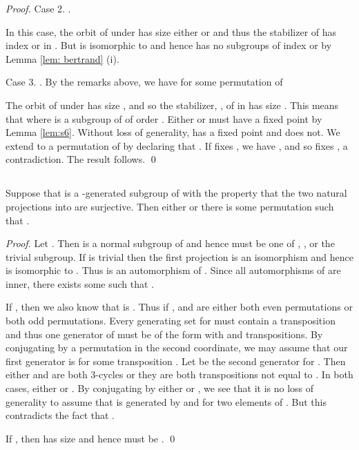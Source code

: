 \documentclass{llncs}
\begin{document}
\begin{proof}
\item[Case 2. .]

In this case, the orbit of  under  has size either  or  and thus the stabilizer of  has index  or  in .  But  is isomorphic to  and hence has no subgroups of index  or  by Lemma \ref{lem: bertrand} (i).

\item[Case 3. .]
By the remarks above, we have 
 for some permutation  of 

The orbit of  under  has size , and so the stabilizer, , of  in  has size .  This means  that  where  is a subgroup of  of order .  Either  or  must have a fixed point by Lemma \ref{lem:s6}.  Without loss of generality,  has a fixed point and  does not.  We extend  to a permutation of  by declaring that .  If  fixes , we have , and so  fixes , a contradiction.  The result follows.
\qed
\end{proof}

\subsection{}
\begin{lemma}   
Suppose that  is a -generated subgroup of  with the property that the two natural projections into  are surjective.  Then either  or there is some permutation  such that .  
\label{lem:s3}
\end{lemma}
\begin{proof}
Let .  Then  is a normal subgroup of  and hence must be one of , , or the trivial subgroup.  If  is trivial then the first projection is an isomorphism and hence  is isomorphic to .  Thus  is an automorphism of .  Since all automorphisms of  are inner, there exists some  such that .  

If , then we also know that  is .  Thus if ,  and  are either both even permutations or both odd permutations.  Every generating set for  must contain a transposition and thus one generator of  must be of the form  with  and  transpositions.  By conjugating by a permutation in the second coordinate, we may assume that our first generator is  for some transposition .  Let  be the second generator for .  Then either  and  are both 3-cycles or they are both transpositions not equal to .  In both cases, either  or . By conjugating by either  or  , we see that it is no loss of generality to assume that  is generated by  and  for two elements of .  But this contradicts the fact that .

If , then  has size  and hence must be . 
\qed
\end{proof}
\end{document}
